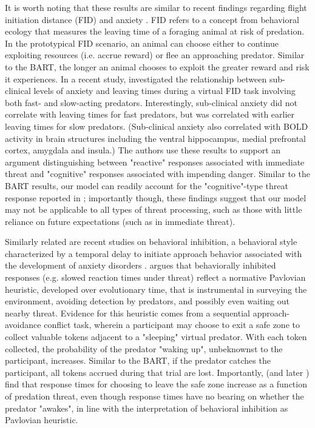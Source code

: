 \documentclass[11pt]{article} %
\begin{document}
It is worth noting that these results are similar to recent findings regarding flight initiation distance (FID) and anxiety \citep{Mobbs2018, Mobbs2019}. FID refers to a concept from behavioral ecology that measures the leaving time of a foraging animal at risk of predation. In the prototypical FID scenario, an animal can choose either to continue exploiting resources (i.e. accrue reward) or flee an approaching predator. Similar to the BART, the longer an animal chooses to exploit the greater reward and risk it experiences. In a recent study, \cite{Mobbs2019} investigated the relationship between sub-clinical levels of anxiety and leaving times during a virtual FID task involving both fast- and slow-acting predators. Interestingly, sub-clinical anxiety did not correlate with leaving times for fast predators, but was correlated with earlier leaving times for slow predators. (Sub-clinical anxiety also correlated with BOLD activity in brain structures including the ventral hippocampus, medial prefrontal cortex, amygdala and insula.) The authors use these results to support an argument distinguishing between "reactive" responses associated with immediate threat and "cognitive" responses associated with impending danger. Similar to the BART results, our model can readily account for the "cognitive"-type threat response reported in \cite{Mobbs2019}; importantly though, these findings suggest that our model may not be applicable to all types of threat processing, such as those with little reliance on future expectations (such as in immediate threat).

Similarly related are recent studies on behavioral inhibition, a behavioral style characterized by a temporal delay to initiate approach behavior associated with the development of anxiety disorders \citep{bach2015, khemka2017}. \cite{bach2015} argues that behaviorally inhibited responses (e.g. slowed reaction times under threat) reflect a normative Pavlovian heuristic, developed over evolutionary time, that is instrumental in surveying the environment, avoiding detection by predators, and possibly even waiting out nearby threat. Evidence for this heuristic comes from a sequential approach-avoidance conflict task, wherein a participant may choose to exit a safe zone to collect valuable tokens adjacent to a "sleeping" virtual predator. With each token collected, the probability of the predator "waking up", unbeknownst to the participant, increases. Similar to the BART, if the predator catches the participant, all tokens accrued during that trial are lost. Importantly, \cite{bach2015} (and later \cite{khemka2017}) find that response times for choosing to leave the safe zone increase as a function of predation threat, even though response times have no bearing on whether the predator "awakes", in line with the interpretation of behavioral inhibition as Pavlovian heuristic. 
\end{document}

